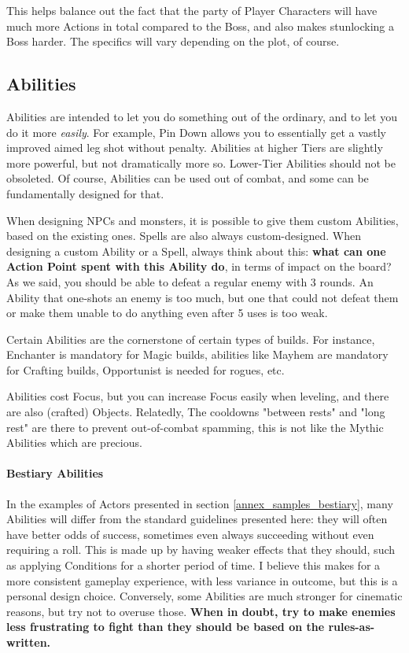 This helps balance out the fact that the party of Player Characters will have much more Actions in total compared to the Boss, and also makes stunlocking a Boss harder. The specifics will vary depending on the plot, of course.




\subsection{Abilities}

Abilities are intended to let you do something out of the ordinary, and to let you do it more \textit{easily}. For example, Pin Down allows you to essentially get a vastly improved aimed leg shot without penalty. Abilities at higher Tiers are slightly more powerful, but not dramatically more so. Lower-Tier Abilities should not be obsoleted. Of course, Abilities can be used out of combat, and some can be fundamentally designed for that.

When designing NPCs and monsters, it is possible to give them custom Abilities, based on the existing ones. Spells are also always custom-designed. When designing a custom Ability or a Spell, always think about this: \textbf{what can one Action Point spent with this Ability do}, in terms of impact on the board? As we said, you should be able to defeat a regular enemy with 3 rounds. An Ability that one-shots an enemy is too much, but one that could not defeat them or make them unable to do anything even after 5 uses is too weak.

Certain Abilities are the cornerstone of certain types of builds. For instance, Enchanter is mandatory for Magic builds, abilities like Mayhem are mandatory for Crafting builds, Opportunist is needed for rogues, etc.

Abilities cost Focus, but you can increase Focus easily when leveling, and there are also (crafted) Objects. Relatedly, The cooldowns "between rests" and "long rest" are there to prevent out-of-combat spamming, this is not like the Mythic Abilities which are precious.


\paragraph{Bestiary Abilities}

In the examples of Actors presented in section \ref{annex_samples_bestiary}, many Abilities will differ from the standard guidelines presented here: they will often have better odds of success, sometimes even always succeeding without even requiring a roll. This is made up by having weaker effects that they should, such as applying Conditions for a shorter period of time. I believe this makes for a more consistent gameplay experience, with less variance in outcome, but this is a personal design choice. Conversely, some Abilities are much stronger for cinematic reasons, but try not to overuse those. \textbf{When in doubt, try to make enemies less frustrating to fight than they should be based on the rules-as-written.}

